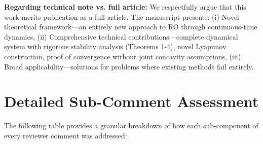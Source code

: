 \documentclass[journal,twoside,web]{ieeecolor}
\begin{document}
\vspace{0.5em}
\noindent\textbf{Regarding technical note vs. full article:} We respectfully argue that this work merits publication as a full article. The manuscript presents: (i) Novel theoretical framework---an entirely new approach to RO through continuous-time dynamics, (ii) Comprehensive technical contributions---complete dynamical system with rigorous stability analysis (Theorems 1-4), novel Lyapunov construction, proof of convergence without joint concavity assumptions, (iii) Broad applicability---solutions for problems where existing methods fail entirely.

\newpage
\section*{Detailed Sub-Comment Assessment}

The following table provides a granular breakdown of how each sub-component of every reviewer comment was addressed:
\end{document}
